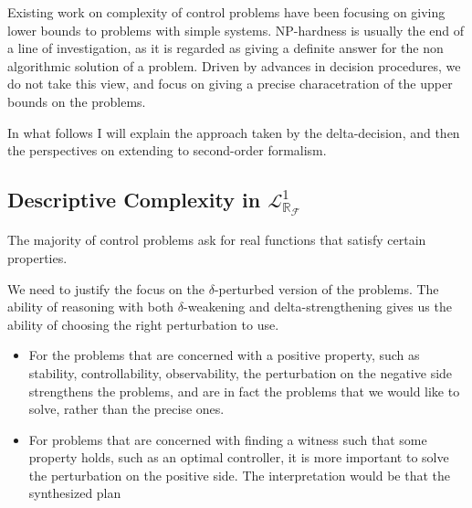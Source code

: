 \documentclass[10pt]{article}
\newcommand{\lrf}{\mathcal{L}_{\mathbb{R}_{\mathcal{F}}}}
\theoremstyle{definition}
\begin{document}
Existing work on complexity of control problems have been focusing on giving lower bounds to problems with simple systems. NP-hardness is usually the end of a line of investigation, as it is regarded as giving a definite answer for the non algorithmic solution of a problem. Driven by advances in decision procedures, we do not take this view, and focus on giving a precise characetration of the upper bounds on the problems. 

In what follows I will explain the approach taken by the delta-decision, and then the perspectives on extending to second-order formalism. 

\subsection{Descriptive Complexity in $\lrf^1$} 

The majority of control problems ask for real functions that satisfy certain properties. 

We need to justify the focus on the $\delta$-perturbed version of the problems. The ability of reasoning with both $\delta$-weakening and delta-strengthening gives us the ability of choosing the right perturbation to use. 
\begin{itemize}
\item For the problems that are concerned with a positive property, such as stability, controllability, observability, the perturbation on the negative side strengthens the problems, and are in fact the problems that we would like to solve, rather than the precise ones. 
\item For problems that are concerned with finding a witness such that some property holds, such as an optimal controller, it is more important to solve the perturbation on the positive side. The interpretation would be that the synthesized plan 
\end{itemize}
\end{document}
